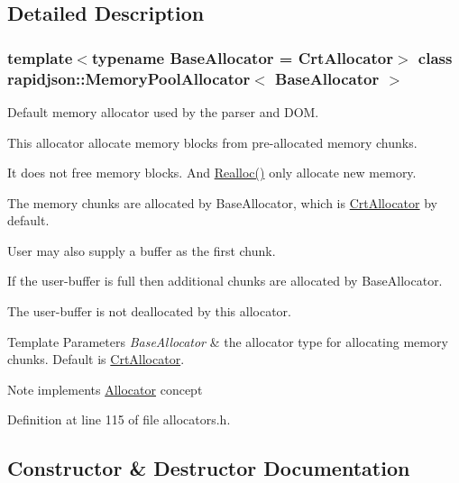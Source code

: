 \subsection{Detailed Description}
\subsubsection*{template$<$typename Base\+Allocator = Crt\+Allocator$>$\newline
class rapidjson\+::\+Memory\+Pool\+Allocator$<$ Base\+Allocator $>$}

Default memory allocator used by the parser and D\+OM. 

This allocator allocate memory blocks from pre-\/allocated memory chunks.

It does not free memory blocks. And \mbox{\hyperlink{classrapidjson_1_1_memory_pool_allocator_a880524b17bbecb5d2691b8075050d55d}{Realloc()}} only allocate new memory.

The memory chunks are allocated by Base\+Allocator, which is \mbox{\hyperlink{classrapidjson_1_1_crt_allocator}{Crt\+Allocator}} by default.

User may also supply a buffer as the first chunk.

If the user-\/buffer is full then additional chunks are allocated by Base\+Allocator.

The user-\/buffer is not deallocated by this allocator.


\begin{DoxyTemplParams}{Template Parameters}
{\em Base\+Allocator} & the allocator type for allocating memory chunks. Default is \mbox{\hyperlink{classrapidjson_1_1_crt_allocator}{Crt\+Allocator}}. \\
\hline
\end{DoxyTemplParams}
\begin{DoxyNote}{Note}
implements \mbox{\hyperlink{classrapidjson_1_1_allocator}{Allocator}} concept 
\end{DoxyNote}


Definition at line 115 of file allocators.\+h.



\subsection{Constructor \& Destructor Documentation}
\mbox{\label{classrapidjson_1_1_memory_pool_allocator_a59d783f4feba17dcd35d9f25fcbc09f4}} 
